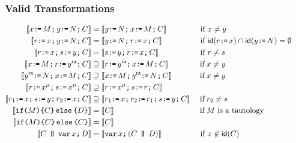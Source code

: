 \documentclass[t,aspectratio=169]{beamer} %
\begin{document}
\begin{frame}
  \frametitle{Valid Transformations}
  \begin{align*}
    \sem{\aLoc \GETS \aExp \SEMI \bLoc  \GETS \bExp\SEMI\aCmd} &=
    \sem{\bLoc  \GETS \bExp\SEMI \aLoc \GETS \aExp\SEMI\aCmd} &&\text{ if } \aLoc\neq\bLoc
    \\
    \sem{\aReg \GETS \aLoc \SEMI \bLoc  \GETS \bExp\SEMI\aCmd} &=
    \sem{\bLoc  \GETS \bExp\SEMI \aReg \GETS \aLoc\SEMI\aCmd} &&\text{ if } \disjoint{{\free(\aReg \GETS \aLoc)}}{{\free(\bLoc \GETS \bExp)}}
    \\
    \sem{\aReg \GETS \aLoc \SEMI \bReg  \GETS \bLoc\SEMI\aCmd} &=
    \sem{\bReg  \GETS \bLoc\SEMI \aReg \GETS \aLoc\SEMI\aCmd} &&\text{ if } \aReg\neq\bReg
    \\
    \sem{x \GETS \aExp \SEMI\aReg \GETS y\ACQ \SEMI\aCmd} &\supseteq
    \sem{\aReg \GETS y\ACQ  \SEMI x\GETS \aExp \SEMI \aCmd} 
    &&\textif x\neq y&&\hbox{}
    \\
    \sem{y\REL \GETS \bExp \SEMI x \GETS \aExp \SEMI \aCmd} &\supseteq
    \sem{x \GETS \aExp \SEMI y\REL \GETS \bExp \SEMI \aCmd}
    &&\textif x\neq y&&\hbox{}
    \\
    \sem{\aReg \GETS \aLoc^\amode \SEMI \bReg  \GETS \aLoc^\amode\SEMI\aCmd} &\supseteq 
    \sem{\aReg \GETS \aLoc^\amode \SEMI \bReg  \GETS \aReg\SEMI\aCmd}
    \\
    \sem{r_1\GETS \aLoc \SEMI
      s\GETS \bLoc \SEMI  
      r_2\GETS \aLoc\SEMI\aCmd}
    &\supseteq
    \sem{r_1\GETS \aLoc \SEMI     
      r_2\GETS r_1\SEMI
      s\GETS \bLoc \SEMI\aCmd}
    &&\textif \aReg_2\neq\bReg
    \\
    \sem{\IF{\aExp}\THEN\aCmd\ELSE\bCmd\FI} &=
    \sem{\aCmd}
    &&\textif \aExp \text{ is a tautology}
    \\
    \sem{\IF{\aExp}\THEN\aCmd\ELSE\aCmd\FI} &=
    \sem{\aCmd}
    \\
    \sem{\aCmd\PAR \VAR\aLoc\SEMI\bCmd} &=
    \sem{\VAR\aLoc\SEMI(\aCmd\PAR\bCmd)}
    &&\text{ if } \aLoc\not\in\free(\aCmd)
  \end{align*}  
\end{frame}
\end{document}
